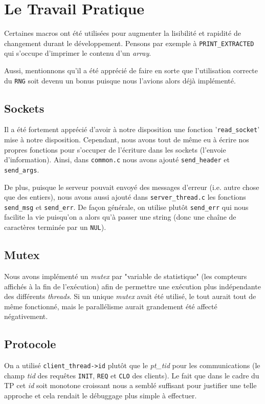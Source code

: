 \documentclass[11pt]{article}
\begin{document}
\section{Le Travail Pratique}

Certaines macros ont été utilisées pour augmenter la lisibilité et rapidité de changement durant le développement. Pensons par exemple à \texttt{PRINT\_EXTRACTED} qui s'occupe d'imprimer le contenu d'un \textit{array}.

Aussi, mentionnons qu'il a été apprécié de faire en sorte que l'utilisation correcte du \texttt{RNG} soit devenu un bonus puisque nous l'avions alors déjà implémenté.


\subsection{Sockets}

Il a été fortement apprécié d'avoir à notre disposition une fonction '\texttt{read\_socket}' mise à notre disposition. Cependant, nous avons tout de même eu à écrire nos propres fonctions pour s'occuper de l'écriture dans les sockets (l'envoie d'information). Ainsi, dans \texttt{common.c} nous avons ajouté \texttt{send\_header} et \texttt{send\_args}.

De plus, puisque le serveur pouvait envoyé des messages d'erreur (i.e. autre chose que des entiers), nous avons aussi ajouté dans \texttt{server\_thread.c} les fonctions \texttt{send\_msg} et \texttt{send\_err}. De façon générale, on utilise plutôt \texttt{send\_err} qui nous facilite la vie puisqu'on a alors qu'à passer une string (donc une chaîne de caractères terminée par un \texttt{NUL}).


\subsection{Mutex}

Nous avons implémenté un \textit{mutex} par "variable de statistique" (les compteurs affichés à la fin de l'exécution) afin de permettre une exécution plus indépendante des différents \textit{threads}. Si un unique \textit{mutex} avait été utilisé, le tout aurait tout de même fonctionné, mais le parallélisme aurait grandement été affecté négativement.


\subsection{Protocole}

On a utilisé \texttt{client\_thread->id} plutôt que le \textit{pt\_tid} pour les communications (le champ \textit{tid} des requêtes \texttt{INIT}, \texttt{REQ} et \texttt{CLO} des clients). Le fait que dans le cadre du TP cet \textit{id} soit monotone croissant nous a semblé suffisant pour justifier une telle approche et cela rendait le débuggage plus simple à effectuer.
\end{document}
